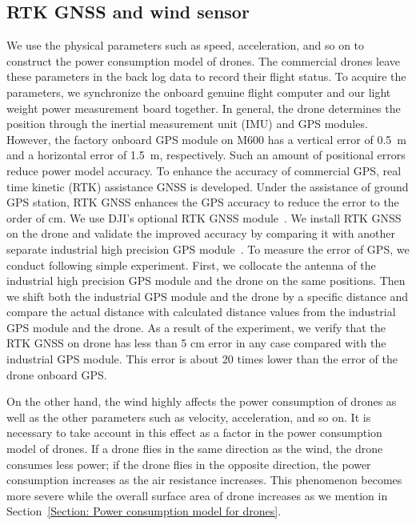 \documentclass[journal]{./template/IEEEtran}
\begin{document}
\subsection{RTK GNSS and wind sensor}
We use the physical parameters such as speed, acceleration, and so on to construct the power consumption model of drones.
The commercial drones leave these parameters in the back log data to record their flight status.
To acquire the parameters, we synchronize the onboard genuine flight computer and our light weight power measurement board together. In general, the drone determines the position through the inertial measurement unit (IMU) and GPS modules. 
However, the factory onboard GPS module on M600 has a vertical error of 0.5~m and a horizontal error of 1.5~m, respectively. 
Such an amount of positional errors reduce power model accuracy.
To enhance the accuracy of commercial GPS, real time kinetic (RTK) assistance GNSS is developed. Under the assistance of ground GPS station, RTK GNSS enhances the GPS accuracy to reduce the error to the order of cm. We use DJI's optional RTK GNSS module~\cite{ref_13}.
We install RTK GNSS on the drone and validate the improved accuracy by comparing it with another separate industrial high precision GPS module~\cite{ref_14}.
To measure the error of GPS, we conduct following simple experiment. First, we collocate the antenna of the industrial high precision GPS module and the drone on the same positions. Then we shift both the industrial GPS module and the drone by a specific distance and compare the actual distance with calculated distance values from the industrial GPS module and the drone.
As a result of the experiment, we verify that the RTK GNSS on drone has less than 5 cm error in any case compared with the industrial GPS module. This error is about 20 times lower than the error of the drone onboard GPS.

On the other hand, the wind highly affects the power consumption of drones as well as the other parameters such as velocity, acceleration, and so on.
It is necessary to take account in this effect as a factor in the power consumption model of drones. 
If a drone flies in the same direction as the wind, the drone consumes less power; if the drone flies in the opposite direction, the power consumption increases as the air resistance increases. 
This phenomenon becomes more severe while the overall surface area of drone increases as we mention in Section~\ref{Section: Power consumption model for drones}.
\end{document}
